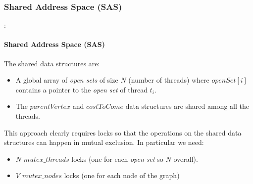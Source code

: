 \documentclass[12pt]{beamer}
\begin{document}
	\subsubsection{Shared Address Space (SAS)}
	\begin{frame}{\secname : \subsecname}
		\framesubtitle{Shared Address Space (SAS)}
		The shared data structures are:
		\begin{itemize}
			\item A global array of \textit{open sets} of size $N$ (number of threads)
				  where $openSet[i]$ contains a pointer to the \textit{open set} of thread $t_i$.
			\item The $parentVertex$ and $costToCome$ data structures are shared among all the threads.
		\end{itemize}
		This approach clearly requires locks so that the operations on the shared data structures
		can happen in mutual exclusion. In particular we need:
		\begin{itemize}
			\item $N$ $mutex\_threads$ locks (one for each \textit{open set} so $N$ overall).
			\item $V$ $mutex\_nodes$ locks (one for each node of the graph)
		\end{itemize}
	\end{frame}
\end{document}
